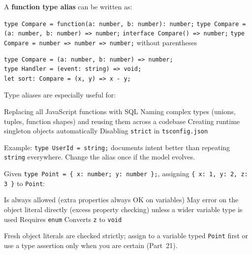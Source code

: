 \question[4]
A \textbf{function type alias} can be written as:
\begin{choices}
  \choice \lstinline[style=tsinline]|type Compare = function(a: number, b: number): number;|
  \CorrectChoice \lstinline[style=tsinline]|type Compare = (a: number, b: number) => number;|
  \choice \lstinline[style=tsinline]|interface Compare() => number;|
  \choice \lstinline[style=tsinline]|type Compare = number => number => number;| without parentheses
\end{choices}
\begin{solution}
\begin{lstlisting}[style=ts]
type Compare = (a: number, b: number) => number;
type Handler = (event: string) => void;
let sort: Compare = (x, y) => x - y;
\end{lstlisting}
\end{solution}

\question[4]
Type aliases are especially useful for:
\begin{choices}
  \choice Replacing all JavaScript functions with SQL
  \CorrectChoice Naming complex types (unions, tuples, function shapes) and reusing them across a codebase
  \choice Creating runtime singleton objects automatically
  \choice Disabling \texttt{strict} in \texttt{tsconfig.json}
\end{choices}
\begin{solution}
  Example: \lstinline[style=tsinline]|type UserId = string;| documents intent better than repeating \lstinline[style=tsinline]|string| everywhere. Change the alias once if the model evolves.
\end{solution}

\question[4]
Given \lstinline[style=tsinline]|type Point = { x: number; y: number };|, assigning \lstinline[style=tsinline]|{ x: 1, y: 2, z: 3 }| to \lstinline[style=tsinline]|Point|:
\begin{choices}
  \choice Is always allowed (extra properties always OK on variables)
  \CorrectChoice May error on the object literal directly (excess property checking) unless a wider variable type is used
  \choice Requires \lstinline[style=tsinline]|enum|
  \choice Converts \lstinline[style=tsinline]|z| to \lstinline[style=tsinline]|void|
\end{choices}
\begin{solution}
  Fresh object literals are checked strictly; assign to a variable typed \lstinline[style=tsinline]|Point| first or use a type assertion only when you are certain (Part~21).
\end{solution}

